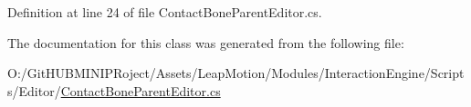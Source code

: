 Definition at line 24 of file Contact\+Bone\+Parent\+Editor.\+cs.



The documentation for this class was generated from the following file\+:\begin{DoxyCompactItemize}
\item 
O\+:/\+Git\+H\+U\+B\+M\+I\+N\+I\+P\+Roject/\+Assets/\+Leap\+Motion/\+Modules/\+Interaction\+Engine/\+Scripts/\+Editor/\mbox{\hyperlink{_contact_bone_parent_editor_8cs}{Contact\+Bone\+Parent\+Editor.\+cs}}\end{DoxyCompactItemize}
